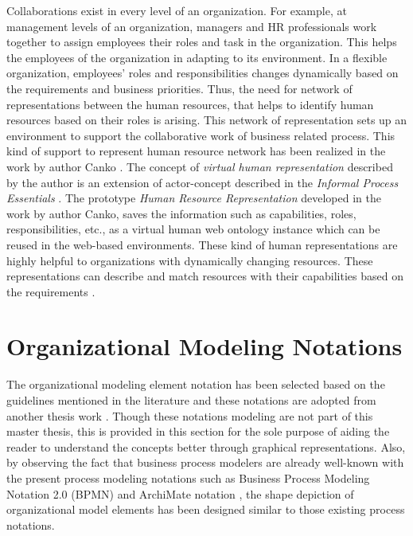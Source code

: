 Collaborations exist in every level of an organization. For example, at management levels of an organization, managers and HR professionals work together to assign employees their roles and task in the organization. This helps the employees of the organization in adapting to its environment. In a flexible organization, employees' roles and responsibilities changes dynamically based on the requirements and business priorities. Thus, the need for network of representations between the human resources, that helps to identify human resources based on their roles is arising. This network of representation sets up an environment to support the collaborative work of business related process. This kind of support to represent human resource network has been realized in the work by author Canko \cite{Canko2015}. The concept of \textit{virtual human representation} described by the author is an extension of actor-concept described in the \textit{Informal Process Essentials} \cite{Sungur2014a}. The prototype \textit{Human Resource Representation} developed in the work by author Canko, saves the information such as capabilities, roles, responsibilities, etc., as a virtual human web ontology instance which can be reused in the  web-based environments. These kind of human representations are highly helpful to organizations with dynamically changing resources. These representations can describe and match resources with their capabilities based on the requirements \cite{Canko2015}.

\section{Organizational Modeling Notations}
\label{sec:resourcecentricorganizationalmodeling}
The organizational modeling element notation has been selected based on the guidelines mentioned in the literature \cite{Moody2009} and these notations are adopted from another thesis work \cite{Sierr2015}. Though these notations modeling are not part of this master thesis, this is provided in this section for the sole purpose of aiding the reader to understand the concepts better through graphical representations. Also, by observing  the fact that business process modelers are already well-known with the present process modeling notations such as Business Process Modeling Notation 2.0 (BPMN) \cite{bpm2011} and ArchiMate notation \cite{arc2013}, the shape depiction of organizational model elements has been designed similar to those existing process notations. 

